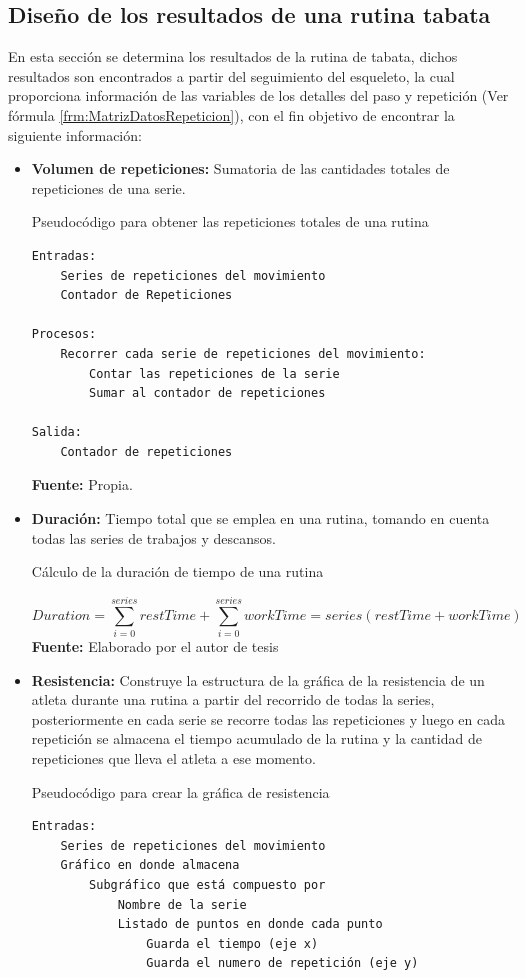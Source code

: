 \subsection{Dise\~no de los resultados de una rutina tabata} \label{dis:results}
En esta secci\'on se determina los resultados de la rutina de tabata, dichos resultados son encontrados a partir del seguimiento del esqueleto, la cual proporciona informaci\'on de las variables de los detalles del paso y repetici\'on (Ver f\'ormula \ref{frm:MatrizDatosRepeticion}), con el fin objetivo de encontrar la siguiente informaci\'on:
\begin{itemize}
\item \textbf{Volumen de repeticiones:} Sumatoria de las cantidades totales de repeticiones de una serie.  
\begin{code}[H]
	\caption{Pseudoc\'odigo para obtener las repeticiones totales de una rutina}
	\label{code:getRepetitions}
	\begin{lstlisting}
Entradas:
	Series de repeticiones del movimiento
	Contador de Repeticiones

Procesos:
	Recorrer cada serie de repeticiones del movimiento:
		Contar las repeticiones de la serie
		Sumar al contador de repeticiones

Salida:
	Contador de repeticiones
	\end{lstlisting}
	\textbf{Fuente:} Propia.
\end{code}

\item \textbf{Duraci\'on:} Tiempo total que se emplea en una rutina, tomando en cuenta todas las series de trabajos y descansos.
\begin{formula}[H]
	\centering
	\caption{C\'alculo de la duraci\'on de tiempo de una rutina}
	\label{eq:DurationTime}
	\begin{equation}
	Duration = \sum_{i=0}^{series}restTime +\sum_{i=0}^{series}workTime = series(restTime+workTime)
	\end{equation}
		\textbf{Fuente:} Elaborado por el autor de tesis
\end{formula}
\item \textbf{Resistencia:} Construye la estructura de la gr\'afica de la resistencia de un atleta durante una rutina a partir del recorrido de todas la series, posteriormente en cada serie se recorre todas las repeticiones y luego en cada repetici\'on se almacena el tiempo acumulado de la rutina y la cantidad de repeticiones que lleva el atleta a ese momento.
\begin{code}[H]
	\caption{Pseudoc\'odigo para crear la gr\'afica de resistencia}
	\label{code:getEndurance}
	\begin{lstlisting}
Entradas:
	Series de repeticiones del movimiento
	Gráfico en donde almacena
		Subgráfico que está compuesto por
			Nombre de la serie
			Listado de puntos en donde cada punto
				Guarda el tiempo (eje x)
				Guarda el numero de repetición (eje y)
	

\end{lstlisting}
\end{code}
\end{itemize}
